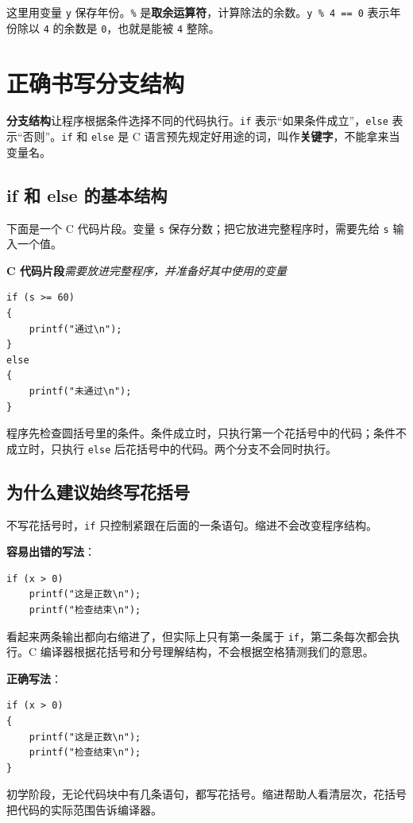 \documentclass[UTF8,zihao=-4,fontset=windows]{ctexart}
\newcommand{\term}[1]{\textbf{\color{navy}#1}}
\newcommand{\good}{\textbf{\color{green}正确写法}}
\newcommand{\bad}{\textbf{\color{red}容易出错的写法}}
\newcommand{\cfragmentlabel}{\noindent\textbf{C 代码片段}\quad\textit{需要放进完整程序，并准备好其中使用的变量}\par\nopagebreak}
\begin{document}
这里用变量 \verb|y| 保存年份。\verb|%| 是\term{取余运算符}，计算除法的余数。\verb|y % 4 == 0| 表示年份除以 \verb|4| 的余数是 \verb|0|，也就是能被 \verb|4| 整除。

\section{正确书写分支结构}

\term{分支结构}让程序根据条件选择不同的代码执行。\verb|if| 表示“如果条件成立”，\verb|else| 表示“否则”。\verb|if| 和 \verb|else| 是 C 语言预先规定好用途的词，叫作\term{关键字}，不能拿来当变量名。

\subsection{if 和 else 的基本结构}

下面是一个 C 代码片段。变量 \verb|s| 保存分数；把它放进完整程序时，需要先给 \verb|s| 输入一个值。

\cfragmentlabel
\begin{lstlisting}[style=cstyle]
if (s >= 60)
{
    printf("通过\n");
}
else
{
    printf("未通过\n");
}
\end{lstlisting}

程序先检查圆括号里的条件。条件成立时，只执行第一个花括号中的代码；条件不成立时，只执行 \verb|else| 后花括号中的代码。两个分支不会同时执行。

\subsection{为什么建议始终写花括号}

不写花括号时，\verb|if| 只控制紧跟在后面的一条语句。缩进不会改变程序结构。

\bad：
\begin{lstlisting}[style=cstyle]
if (x > 0)
    printf("这是正数\n");
    printf("检查结束\n");
\end{lstlisting}

看起来两条输出都向右缩进了，但实际上只有第一条属于 \verb|if|，第二条每次都会执行。C 编译器根据花括号和分号理解结构，不会根据空格猜测我们的意思。

\good：
\begin{lstlisting}[style=cstyle]
if (x > 0)
{
    printf("这是正数\n");
    printf("检查结束\n");
}
\end{lstlisting}

初学阶段，无论代码块中有几条语句，都写花括号。缩进帮助人看清层次，花括号把代码的实际范围告诉编译器。
\end{document}

